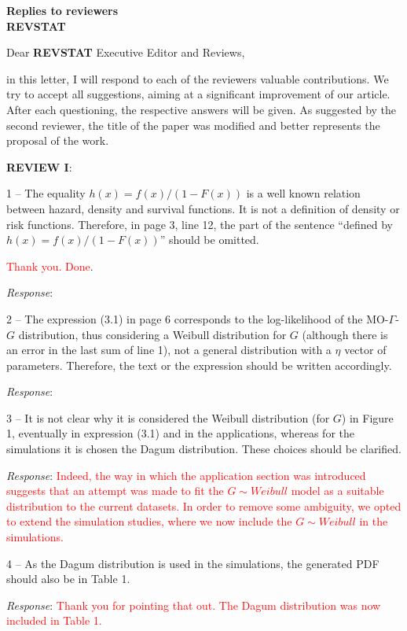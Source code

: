 \documentclass[version=last,12pt,{"maintainersDelight"},letterpaper,]{scrlttr2}
\begin{document}
\begin{letter}{\textbf{Replies to reviewers}\\\textbf{REVSTAT}\\}
\opening{Dear \textbf{REVSTAT} Executive Editor and Reviews,}

in this letter, I will respond to each of the reviewers valuable
contributions. We try to accept all suggestions, aiming at a significant
improvement of our article. After each questioning, the respective
answers will be given. As suggested by the second reviewer, the title of
the paper was modified and better represents the proposal of the work.

\textbf{REVIEW I}:

1 -- The equality \(h(x)=f(x)/(1-F(x))\) is a well known relation
between hazard, density and survival functions. It is not a definition of density or risk functions. Therefore, in page 3, line 12, the part of the sentence ``defined by \(h(x)=f(x)/(1-F(x))\)'' should be omitted.

\textcolor{red}{Thank you. Done}. 

\emph{Response}:

2 -- The expression (3.1) in page 6 corresponds to the log-likelihood of the MO-\(\Gamma\)-\(G\) distribution, 
thus considering a Weibull distribution
for \(G\) (although there is an error in the last sum 
of line 1), not a general distribution with a \(\eta\) 
vector of parameters. Therefore, the text or the expression 
should be written accordingly.

\emph{Response}:

3 -- It is not clear why it is considered the Weibull distribution (for \(G\)) in Figure 1, eventually in expression (3.1) and in 
the applications, whereas for the simulations it is chosen the 
Dagum distribution. These choices should be clarified.

\emph{Response}:
\textcolor{red}{Indeed, the way in which the application section was introduced suggests that an attempt was made to fit the $G\sim Weibull$ model as a suitable distribution to the current datasets. In order to remove some ambiguity, we opted to extend the simulation studies, where we now include the $G\sim Weibull$ in the simulations.}

4 -- As the Dagum distribution is used in the simulations, the generated PDF should also be in Table 1.

\emph{Response}:
\textcolor{red}{Thank you for pointing that out. The Dagum distribution was now included in Table 1.}


\end{letter}
\end{document}
